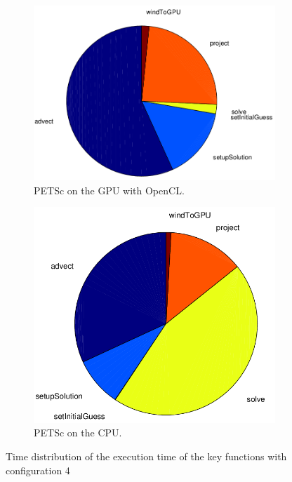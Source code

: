 \begin{figure}[ht]
	\center
	
	\begin{subfigure}{0.45\textwidth}
		\center
		\includegraphics[width=1.0\textwidth]{results/data/td/td_conf4_petsc_gpu}
		\caption{PETSc on the GPU with OpenCL.}
		\label{fig:td_conf4_petsc_gpu}
	\end{subfigure}
	\begin{subfigure}{0.45\textwidth}
		\center
		\includegraphics[width=1.0\textwidth]{results/data/td/td_conf4_petsc_cpu}
		\caption{PETSc on the CPU.}
		\label{fig:td_conf4_petsc_cpu}
	\end{subfigure}
	\caption{Time distribution of the execution time of the key functions
			with configuration 4}
	\label{fig:td_conf4}
	
\end{figure}

